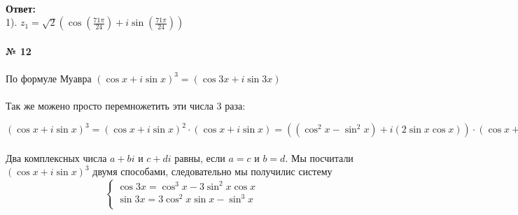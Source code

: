 \documentclass[a4paper, 12pt]{article}
\begin{document}
    \\ \textbf{Ответ: } 
    \\ 1). $z_1 = \sqrt{2}\left(\cos \left(\frac{71\pi}{24}\right) + i\sin \left(\frac{71\pi}{24}\right)\right)$
    \\
    \\ \textbf{№ 12}
    \\
    \\ По формуле Муавра $(\cos x  + i \sin x)^3 = (\cos 3x + i \sin 3x)$
    \\
    \\ Так же можено просто перемножетить эти числа 3 раза: 
    \par $(\cos x  + i \sin x)^3 = (\cos x  + i \sin x)^2 \cdot (\cos x  + i \sin x) = ((\cos ^2 x - \sin ^2 x) + i (2\sin x \cos x)) \cdot (\cos x  + i \sin x) = (\cos ^3 x - 3\sin^2 x \cos x) + i(3\cos ^2 x \sin x - \sin ^3 x)$
    \\
    \\ Два комплексных числа $a + bi$ и $c + di$ равны, если $a = c$ и $b = d$. Мы посчитали $(\cos x  + i \sin x)^3$ двумя способами, следовательно мы получилис систему
    \begin{equation*}
        \begin{cases}
            \cos 3x =  \cos ^3 x - 3\sin^2 x \cos x \\
            \sin 3x = 3\cos ^2 x \sin x - \sin ^3 x \\
        \end{cases}
    \end{equation*}
\end{document}
